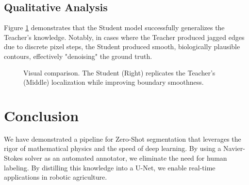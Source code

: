 \documentclass[journal]{IEEEtran}
\begin{document}
\subsection{Qualitative Analysis}
Figure \ref{fig:qual} demonstrates that the Student model successfully generalizes the Teacher's knowledge. Notably, in cases where the Teacher produced jagged edges due to discrete pixel steps, the Student produced smooth, biologically plausible contours, effectively "denoising" the ground truth.

\begin{figure}[htbp]
\centerline{}
\caption{Visual comparison. The Student (Right) replicates the Teacher's (Middle) localization while improving boundary smoothness.}
\label{fig:qual}
\end{figure}

\section{Conclusion}
We have demonstrated a pipeline for Zero-Shot segmentation that leverages the rigor of mathematical physics and the speed of deep learning. By using a Navier-Stokes solver as an automated annotator, we eliminate the need for human labeling. By distilling this knowledge into a U-Net, we enable real-time applications in robotic agriculture.



\end{document}
